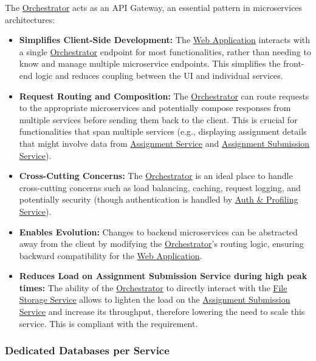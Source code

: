 \begin{justify}
    The \hyperref[def:Orchestrator]{Orchestrator} acts as an API Gateway, an essential pattern in microservices architectures:
\end{justify}
\begin{itemize}
    \item \textbf{Simplifies Client-Side Development:} The \hyperref[def:WebApplication]{Web Application} interacts with a single \hyperref[def:Orchestrator]{Orchestrator} endpoint for most functionalities, rather than needing to know and manage multiple microservice endpoints. This simplifies the front-end logic and reduces coupling between the UI and individual services.
    \item \textbf{Request Routing and Composition:} The \hyperref[def:Orchestrator]{Orchestrator} can route requests to the appropriate microservices and potentially compose responses from multiple services before sending them back to the client. This is crucial for functionalities that span multiple services (e.g., displaying assignment details that might involve data from \hyperref[def:AssignmentService]{Assignment Service} and \hyperref[def:AssignmentSubmissionService]{Assignment Submission Service}).
    \item \textbf{Cross-Cutting Concerns:} The \hyperref[def:Orchestrator]{Orchestrator} is an ideal place to handle cross-cutting concerns such as load balancing, caching, request logging, and potentially security (though authentication is handled by \hyperref[def:AuthProfilingService]{Auth \& Profiling Service}).
    \item \textbf{Enables Evolution:} Changes to backend microservices can be abstracted away from the client by modifying the \hyperref[def:Orchestrator]{Orchestrator}'s routing logic, ensuring backward compatibility for the \hyperref[def:WebApplication]{Web Application}.
    \item \textbf{Reduces Load on Assignment Submission Service during high peak times:} The ability of the \hyperref[def:Orchestrator]{Orchestrator} to directly interact with the \hyperref[def:FileStorageService]{File Storage Service} allows to lighten the load on the \hyperref[def:AssignmentSubmissionService]{Assignment Submission Service} and increase its throughput, therefore lowering the need to scale this service. This is compliant with the  requirement.
\end{itemize}

\subsubsection{Dedicated Databases per Service}

